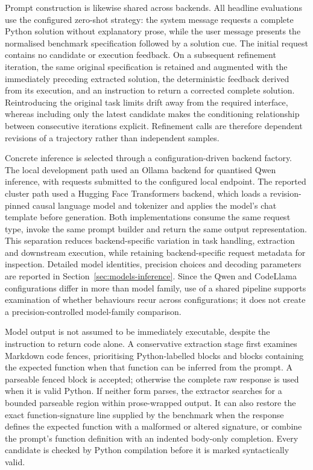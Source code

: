 Prompt construction is likewise shared across backends. All headline evaluations use the configured zero-shot strategy: the system message requests a complete Python solution without explanatory prose, while the user message presents the normalised benchmark specification followed by a solution cue. The initial request contains no candidate or execution feedback. On a subsequent refinement iteration, the same original specification is retained and augmented with the immediately preceding extracted solution, the deterministic feedback derived from its execution, and an instruction to return a corrected complete solution. Reintroducing the original task limits drift away from the required interface, whereas including only the latest candidate makes the conditioning relationship between consecutive iterations explicit. Refinement calls are therefore dependent revisions of a trajectory rather than independent samples.

Concrete inference is selected through a configuration-driven backend factory. The local development path used an Ollama backend for quantised Qwen inference, with requests submitted to the configured local endpoint. The reported cluster path used a Hugging Face Transformers backend, which loads a revision-pinned causal language model and tokenizer and applies the model's chat template before generation. Both implementations consume the same request type, invoke the same prompt builder and return the same output representation. This separation reduces backend-specific variation in task handling, extraction and downstream execution, while retaining backend-specific request metadata for inspection. Detailed model identities, precision choices and decoding parameters are reported in Section~\ref{sec:models-inference}. Since the Qwen and CodeLlama configurations differ in more than model family, use of a shared pipeline supports examination of whether behaviours recur across configurations; it does not create a precision-controlled model-family comparison.

Model output is not assumed to be immediately executable, despite the instruction to return code alone. A conservative extraction stage first examines Markdown code fences, prioritising Python-labelled blocks and blocks containing the expected function when that function can be inferred from the prompt. A parseable fenced block is accepted; otherwise the complete raw response is used when it is valid Python. If neither form parses, the extractor searches for a bounded parseable region within prose-wrapped output. It can also restore the exact function-signature line supplied by the benchmark when the response defines the expected function with a malformed or altered signature, or combine the prompt's function definition with an indented body-only completion. Every candidate is checked by Python compilation before it is marked syntactically valid.

